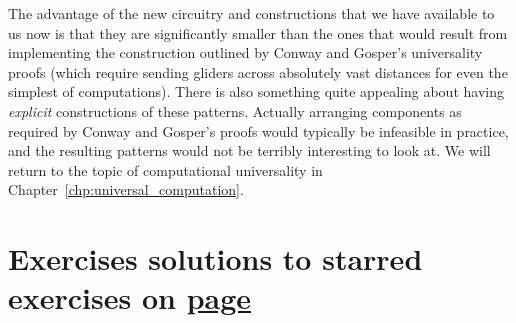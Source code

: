 The advantage of the new circuitry and constructions that we have available to us now is that they are significantly smaller than the ones that would result from implementing the construction outlined by Conway and Gosper's universality proofs  (which require sending gliders across absolutely vast distances for even the simplest of computations). There is also something quite appealing about having \emph{explicit} constructions of these patterns. Actually arranging components as required by Conway and Gosper's proofs would typically be infeasible in practice, and the resulting patterns would not be terribly interesting to look at. We will return to the topic of computational universality in Chapter~\ref{chp:universal_computation}.


\section*{Exercises \hfill \normalfont\textsf{\small solutions to starred exercises on \hyperlink{solutions_periodic_circuitry}{page \pageref{solutions_periodic_circuitry}}}}
\label{sec:periodic_exercises}
